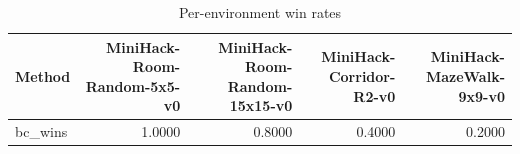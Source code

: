 \begin{table}[htbp]
\centering
\caption{Per-environment win rates}
\label{tab:per-env}
\begin{tabular}{lrrrr}
\toprule
\textbf{Method} & \textbf{MiniHack-Room-Random-5x5-v0} & \textbf{MiniHack-Room-Random-15x15-v0} & \textbf{MiniHack-Corridor-R2-v0} & \textbf{MiniHack-MazeWalk-9x9-v0} \\
\midrule
bc\_wins & 1.0000 & 0.8000 & 0.4000 & 0.2000 \\
\bottomrule
\end{tabular}
\end{table}